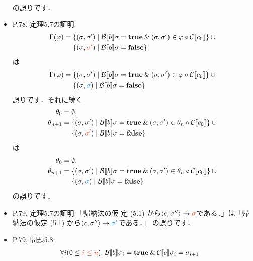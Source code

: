 \documentclass[12pt,titlepage,twoside,openright,dvipdfmx]{jsbook}
\newcommand\old[1]{%
  \textcolor[rgb]{1.0,0.25,0.1}{#1}%
  }
\newcommand\new[1]{%
  \textcolor[rgb]{0,0.55,1.0}{#1}%
  }
\theoremstyle{definition}
\begin{document}
\begin{itemize}
\begin{align*}
    \end{align*}
    の誤りです．
  \item P.78, 定理5.7の証明:
    \begin{align*}
      \Gamma(\varphi) = {}
      & \{(\sigma,\sigma')\mid  \denotation{B}{b}\sigma=\mathbf{true}\AND
        (\sigma,\sigma')\in\varphi\circ\denotation{C}{c_0}\} \cup {} \\
      & \{(\sigma,\old{\sigma'})\mid  \denotation{B}{b}\sigma=\mathbf{false}\}
    \end{align*}
    は
    \begin{align*}
      \Gamma(\varphi) = {}
      & \{(\sigma,\sigma')\mid  \denotation{B}{b}\sigma=\mathbf{true}\AND
        (\sigma,\sigma')\in\varphi\circ\denotation{C}{c_0}\} \cup {} \\
      & \{(\sigma,\new{\sigma})\mid  \denotation{B}{b}\sigma=\mathbf{false}\}
    \end{align*}
    誤りです．それに続く
    \begin{align*}
      \theta_0 = {} & \emptyset, \\
      \theta_{n+1} = {}
                    & \{(\sigma,\sigma')\mid  \denotation{B}{b}\sigma=\mathbf{true}\AND
                      (\sigma,\sigma')\in\theta_n\circ\denotation{C}{c_0}\} \cup {}\\
                    & \{(\sigma,\old{\sigma'})\mid  \denotation{B}{b}\sigma=\mathbf{false}\}
    \end{align*}
    は
    \begin{align*}
      \theta_0 = {} & \emptyset, \\
      \theta_{n+1} = {}
                    & \{(\sigma,\sigma')\mid  \denotation{B}{b}\sigma=\mathbf{true}\AND
                      (\sigma,\sigma')\in\theta_n\circ\denotation{C}{c_0}\} \cup {}\\
                    & \{(\sigma,\new{\sigma})\mid  \denotation{B}{b}\sigma=\mathbf{false}\}
    \end{align*}
    の誤りです．
  \item P.79, 定理5.7の証明:「帰納法の仮
    定 (5.1) から$\tuple{c,\sigma''}\rightarrow\old{\sigma}$である．」は「帰
    納法の仮定 (5.1) から$\tuple{c,\sigma''}\rightarrow\new{\sigma'}$である．」
    の誤りです．
  \item P.79, 問題5.8:
    \begin{align*}
      & \forall{i(0\leq \old{i \leq n})}.\;
        \denotation{B}{b}\sigma_i=\mathbf{true}\AND
        \denotation{C}{c}\sigma_i=\sigma_{i+1}
    \end{align*}

\end{itemize}
\end{document}

